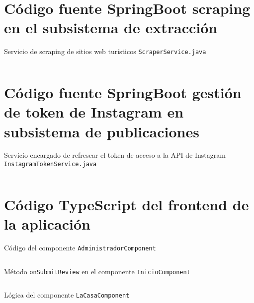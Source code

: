 \section{Código fuente SpringBoot scraping en el subsistema de extracción}\label{ap:extraccion}
\begin{longlisting}
\caption{Servicio de scraping de sitios web turísticos {\tt ScraperService.java}} \inputminted[firstline=15]{java}{../backend/extraccion/extraccion/src/main/java/es/uv/hemal/extraccion/extraccion/services/ScraperService.java} \label{lst:scraperService} \end{longlisting}

\section{Código fuente SpringBoot gestión de token de Instagram en subsistema de publicaciones}\label{ap:instagramtoken}

\begin{longlisting}
\caption{Servicio encargado de refrescar el token de acceso a la API de Instagram {\tt InstagramTokenService.java}}
\inputminted[firstline=6,lastline=30]{java}{../backend/PublicacionesAPI/PublicacionesAPI/src/main/java/es/uv/hemal/elrincondeeva/PublicacionesAPI/services/InstagramTokenService.java}
\label{lst:refreshToken}
\end{longlisting}

\section{Código TypeScript del frontend de la aplicación}\label{ap:frontend-typescript}
\begin{longlisting}
    \caption{Código del componente \texttt{AdministradorComponent}}
    \inputminted{typescript}{../proyecto/src/app/administrador/administrador.component.ts}
    \label{lst:aprobarPagoReserva}
\end{longlisting}
\begin{longlisting}
    \caption{Método \texttt{onSubmitReview} en el componente \texttt{InicioComponent}}
    \inputminted{typescript}{../proyecto/src/app/inicio/inicio.component.ts}
    \label{lst:onSubmitReview}
\end{longlisting}

\begin{longlisting}
    \caption{Lógica del componente \texttt{LaCasaComponent}}
    \inputminted{typescript}{../proyecto/src/app/la-casa/la-casa.component.ts}
    \label{lst:laCasaComponentTs}
\end{longlisting}

